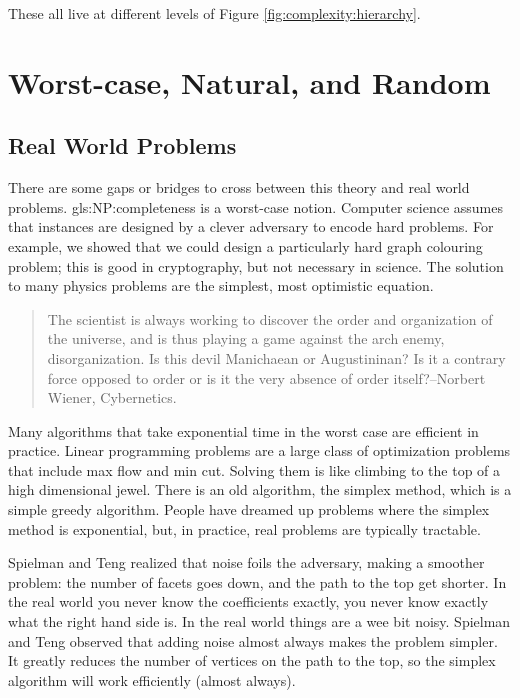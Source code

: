 \documentclass[]{article}
\begin{document}
These all live at different levels of Figure \ref{fig:complexity:hierarchy}.

\section{Worst-case, Natural, and Random}
\cite[Chapters 5,10]{moore2011nature}

\subsection{Real World Problems}

There are some gaps or bridges to cross between this theory and real world problems. \gls{gls:NP:complete}ness is a worst-case notion. Computer science assumes that instances are designed by a clever adversary to encode hard problems. For example, we showed that we could design a particularly hard graph colouring problem; this is good in cryptography, but not necessary in science. The solution to many physics problems are the simplest, most optimistic equation.

\begin{quote}
	The scientist is always working to discover the order and organization of the universe, and is thus playing a game against the arch enemy, disorganization. Is this devil Manichaean or Augustininan? Is it a contrary force opposed to order or is it the very absence of order itself?--Norbert Wiener, Cybernetics.
\end{quote}

Many algorithms that take exponential time in the worst case are efficient in practice.
Linear programming problems are a large class of optimization problems that include max flow and min cut. Solving them is like climbing to the top of a high dimensional jewel. There is an old algorithm, the simplex method, which is a simple greedy algorithm. People have dreamed up problems where the simplex method is exponential, but, in practice, real problems are typically tractable.

Spielman and Teng\cite{spielman2004smoothed} realized that noise foils the adversary, making a smoother problem: the number of facets goes down, and the path to the top get shorter. In the real world you never know the coefficients exactly, you never know exactly what the right hand side is. In the real world things are a wee bit noisy. Spielman and Teng observed that adding noise almost always makes the problem simpler. It greatly reduces the number of vertices on the path to the top, so the simplex algorithm will work efficiently (almost always).
\end{document}
